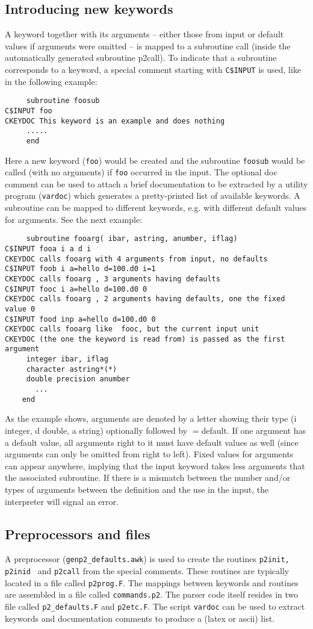 \documentclass[a4paper]{article}
\begin{document}
\subsection{Introducing new keywords}
A keyword together with its arguments -- either those from input or default
values if arguments were omitted -- is mapped to a subroutine call (inside the
automatically generated subroutine p2call). 
To indicate that a subroutine corresponds to a keyword, a
special comment starting with {\tt C\$INPUT} is used, like in the following 
example:
\begin{verbatim}
     subroutine foosub
C$INPUT foo
CKEYDOC This keyword is an example and does nothing
     .....
     end
\end{verbatim}
Here a new keyword ({\tt foo}) would be created and the subroutine 
{\tt foosub} would be called (with no arguments) if {\tt foo} occurred in the
input. The optional doc comment can be used to attach a brief documentation to
be extracted by a utility program ({\tt vardoc}) which generates a
pretty-printed list of available keywords. A subroutine can be mapped to
different keywords, e.g. with different default values for arguments. See the
next example:
\begin{verbatim}
     subroutine fooarg( ibar, astring, anumber, iflag)
C$INPUT fooa i a d i
CKEYDOC calls fooarg with 4 arguments from input, no defaults
C$INPUT foob i a=hello d=100.d0 i=1
CKEYDOC calls fooarg , 3 arguments having defaults
C$INPUT fooc i a=hello d=100.d0 0
CKEYDOC calls fooarg , 2 arguments having defaults, one the fixed value 0
C$INPUT food inp a=hello d=100.d0 0
CKEYDOC calls fooarg like  fooc, but the current input unit 
CKEYDOC (the one the keyword is read from) is passed as the first argument
     integer ibar, iflag
     character astring*(*)
     double precision anumber
       ...
    end
\end{verbatim}
As the example shows, arguments are denoted by a letter showing their type
(i integer, d double, a string) optionally followed by $=$default. If one
argument has a default value, all arguments right to it must have default
values as well (since arguments can only be omitted from right to left).
Fixed values for arguments can appear anywhere, implying that the input
keyword takes less arguments that the associated subroutine.
If there is a mismatch between the number and/or types of arguments between
the definition and the use in the input, the interpreter will signal an error.

\subsection{Preprocessors and files}
A preprocessor ({\tt genp2\_defaults.awk}) is used to create the routines 
{\tt p2init, p2inid } and {\tt p2call} from the special comments. These
routines are typically located in a file called {\tt p2prog.F}.
The mappings between keywords and routines are assembled in a file called
{\tt commands.p2}. The parser code itself resides in two file called 
{\tt p2\_defaults.F} and {\tt p2etc.F}. The script {\tt vardoc} can be used
to extract keywords and documentation comments to produce a (latex or ascii) list.
\end{document}
